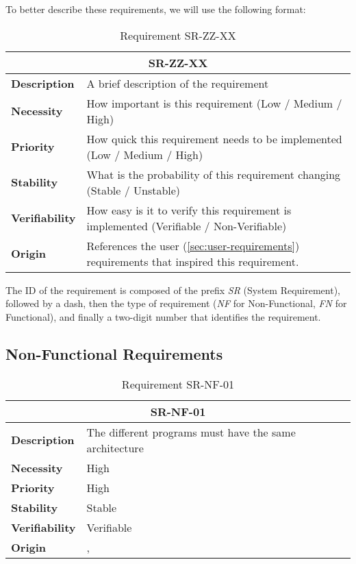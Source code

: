 To better describe these requirements, we will use the following format:

\begin{table}
    \centering
    \begin{tabular}{l p{10cm}}
        \toprule
        \multicolumn{2}{c}{SR-ZZ-XX} \\
        \toprule
        \textbf{Description}        & A brief description of the requirement \\
        \textbf{Necessity}          & How important is this requirement (Low / Medium / High) \\
        \textbf{Priority}           & How quick this requirement needs to be implemented (Low / Medium / High) \\
        \textbf{Stability}          & What is the probability of this requirement changing (Stable / Unstable) \\
        \textbf{Verifiability}      & How easy is it to verify this requirement is implemented (Verifiable / Non-Verifiable) \\
        \textbf{Origin}             & References the user (\autoref{sec:user-requirements}) requirements that inspired this requirement.  \\
    \end{tabular}
    \caption{Requirement SR-ZZ-XX}
\end{table}

The ID of the requirement is composed of the prefix \textit{SR} (System Requirement), followed by a dash, then the type of requirement (\textit{NF} for Non-Functional, \textit{FN} for Functional), and finally a two-digit number that identifies the requirement.

\subsection{Non-Functional Requirements}
\begin{table}[H]
    \centering
    \begin{tabular}{l p{10cm}}
        \toprule
        \multicolumn{2}{c}{SR-NF-01} \\
        \toprule
        \textbf{Description}        & The different programs must have the same architecture \\
        \textbf{Necessity}          &  High \\
        \textbf{Priority}           &  High \\
        \textbf{Stability}          &  Stable \\
        \textbf{Verifiability}      & Verifiable \\
        \textbf{Origin}             &  \textit{\nameref{tab:ur-re-01}}, \textit{\nameref{tab:ur-ca-14}} \\
    \end{tabular}
    \caption{Requirement SR-NF-01}
    \label{tab:sr-nf-01}
\end{table}

